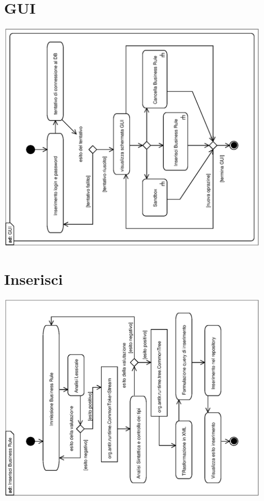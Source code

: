 \documentclass[11pt,titlepage,a4paper]{report}
\begin{document}
\section{GUI}

\begin{center}
 \includegraphics[width=1\textwidth, angle=-90]{GUI.eps}
\end{center}


\section{Inserisci \br}

\begin{center}
 \includegraphics[width=1\textwidth, angle=-90]{InserisciBusinessRule.eps}
\end{center}
\end{document}
